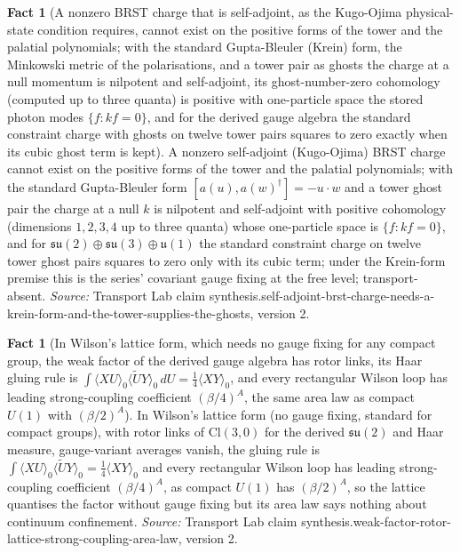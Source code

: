 \documentclass[11pt]{article}
\theoremstyle{definition}
\newtheorem{fact}[theorem]{Fact}
\theoremstyle{plain}
\providecommand{\Cl}{}\renewcommand{\Cl}{\mathrm{Cl}}
\providecommand{\su}{}\renewcommand{\su}{\mathfrak{su}}
\begin{document}
\begin{fact}[A nonzero BRST charge that is self-adjoint, as the Kugo-Ojima physical-state condition requires, cannot exist on the positive forms of the tower and the palatial polynomials; with the standard Gupta-Bleuler (Krein) form, the Minkowski metric of the polarisations, and a tower pair as ghosts the charge at a null momentum is nilpotent and self-adjoint, its ghost-number-zero cohomology (computed up to three quanta) is positive with one-particle space the stored photon modes $\{f : kf = 0\}$, and for the derived gauge algebra the standard constraint charge with ghosts on twelve tower pairs squares to zero exactly when its cubic ghost term is kept]\label{c:synthesis.self-adjoint-brst-charge-needs-a-krein-form-and-the-tower-supplies-the-ghosts}
A nonzero self-adjoint (Kugo-Ojima) BRST charge cannot exist on the positive forms of the tower and the palatial polynomials; with the standard Gupta-Bleuler form $[a(u), a(w)^{\dagger}] = -u\cdot w$ and a tower ghost pair the charge at a null $k$ is nilpotent and self-adjoint with positive cohomology (dimensions $1, 2, 3, 4$ up to three quanta) whose one-particle space is $\{f : kf = 0\}$, and for $\mathfrak{su}(2) \oplus \mathfrak{su}(3) \oplus \mathfrak{u}(1)$ the standard constraint charge on twelve tower ghost pairs squares to zero only with its cubic term; under the Krein-form premise this is the series' covariant gauge fixing at the free level; transport-absent.
\emph{Source:} Transport Lab claim synthesis.self-adjoint-brst-charge-needs-a-krein-form-and-the-tower-supplies-the-ghosts, version 2.
\end{fact}

\begin{fact}[In Wilson's lattice form, which needs no gauge fixing for any compact group, the weak factor of the derived gauge algebra has rotor links, its Haar gluing rule is $\int\langle XU\rangle_0\langle\widetilde{U}Y\rangle_0\,dU = \tfrac14\langle XY\rangle_0$, and every rectangular Wilson loop has leading strong-coupling coefficient $(\beta/4)^{A}$, the same area law as compact $U(1)$ with $(\beta/2)^{A}$]\label{c:synthesis.weak-factor-rotor-lattice-strong-coupling-area-law}
In Wilson's lattice form (no gauge fixing, standard for compact groups), with rotor links of $\Cl(3,0)$ for the derived $\su(2)$ and Haar measure, gauge-variant averages vanish, the gluing rule is $\int\langle XU\rangle_0\langle\widetilde{U}Y\rangle_0 = \tfrac14\langle XY\rangle_0$ and every rectangular Wilson loop has leading strong-coupling coefficient $(\beta/4)^{A}$, as compact $U(1)$ has $(\beta/2)^{A}$, so the lattice quantises the factor without gauge fixing but its area law says nothing about continuum confinement.
\emph{Source:} Transport Lab claim synthesis.weak-factor-rotor-lattice-strong-coupling-area-law, version 2.
\end{fact}
\end{document}
